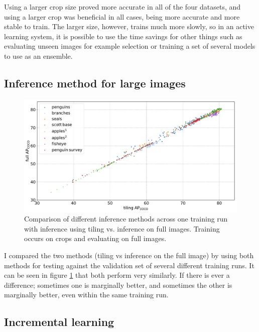 Using a larger crop size proved more accurate in all of the four datasets, and using a larger crop was beneficial in all cases, being more accurate and more stable to train. The larger size, however, trains much more slowly, so in an active learning system, it is possible to use the time savings for other things such as evaluating unseen images for example selection or training a set of several models to use as an ensemble.


\subsection {Inference method for large images}

\begin{figure}[h] 
  \centering
  \includegraphics[width=1.0\linewidth]{charts/training/splits_scatters.pdf}
  \caption{Comparison of different inference methods across one training run with inference using tiling vs. inference on full images. Training occurs on crops and evaluating on full images. }   
  \label{fig:inference_method}
\end{figure}


I compared the two methods (tiling vs inference on the full image) by using both methods for testing against the validation set of several different training runs. It can be seen in figure \ref{fig:inference_method} that both perform very similarly. If there is ever a difference; sometimes one is marginally better, and sometimes the other is marginally better, even within the same training run.

\subsection{Incremental learning}
\label{sec:incremental_learning}

